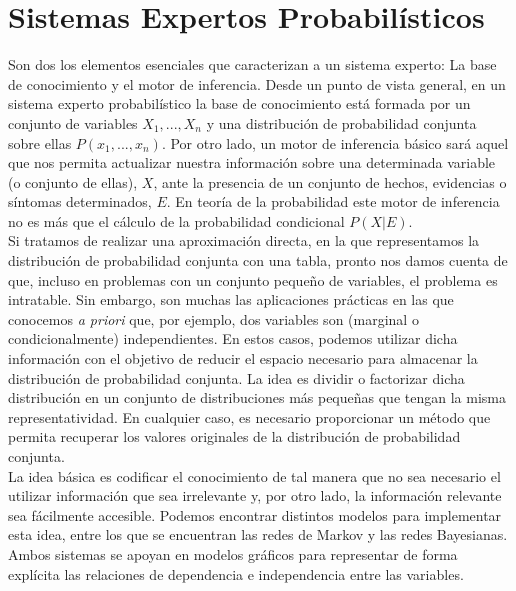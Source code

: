 \documentclass{article}
\begin{document}
\section{Sistemas Expertos Probabilísticos}
Son dos los elementos esenciales que caracterizan a un sistema experto: La base de conocimiento y el motor de inferencia. Desde un punto de vista general, en un sistema experto probabilístico la base de conocimiento está formada por un conjunto de variables $X_1,...,X_n$ y una distribución de probabilidad conjunta sobre ellas $P(x_1,...,x_n)$. Por otro lado, un motor de inferencia básico sará aquel que nos permita actualizar nuestra información sobre una determinada variable (o conjunto de ellas), $X$, ante la presencia de un conjunto de hechos, evidencias o síntomas determinados, $E$. En teoría de la probabilidad este motor de inferencia no es más que el cálculo de la probabilidad condicional $P(X|E)$.\\
Si tratamos de realizar una aproximación directa, en la que representamos la distribución de probabilidad conjunta con una tabla, pronto nos damos cuenta de que, incluso en problemas con un conjunto pequeño de variables, el problema es intratable. Sin embargo, son muchas las aplicaciones prácticas en las que conocemos \textit{a priori} que, por ejemplo, dos variables son (marginal o condicionalmente) independientes. En estos casos, podemos utilizar dicha información con el objetivo de reducir el espacio necesario para almacenar la distribución de probabilidad conjunta. La idea es dividir o factorizar dicha distribución en un conjunto de distribuciones más pequeñas que tengan la misma representatividad. En cualquier caso, es necesario proporcionar un método que permita recuperar los valores originales de la distribución de probabilidad conjunta.\\
La idea básica es codificar el conocimiento de tal manera que no sea necesario el utilizar información que sea irrelevante y, por otro lado, la información relevante sea fácilmente accesible. Podemos encontrar distintos modelos para implementar esta idea, entre los que se encuentran las redes de Markov y las redes Bayesianas. Ambos sistemas se apoyan en modelos gráficos para representar de forma explícita las relaciones de dependencia e independencia entre las variables.
\end{document}
